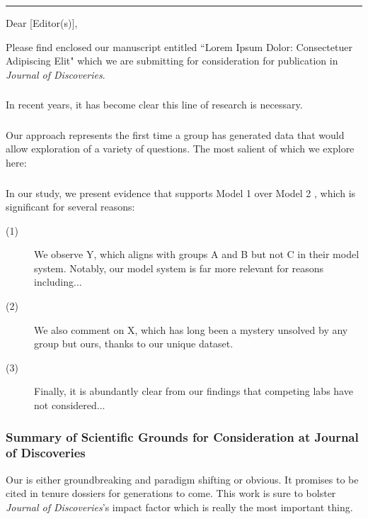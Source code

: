 \documentclass[11pt]{article}
\newcommand{\journalname}{Journal of Discoveries} %
\begin{document}
\noindent\rule{\linewidth}{1.2pt} %
\bigskip
\noindent Dear [Editor(s)],

\noindent Please find enclosed our manuscript entitled ``Lorem Ipsum Dolor: Consectetuer Adipiscing Elit" which we are submitting for consideration for publication in \textit{\journalname}.

\subsubsection{}
\noindent In recent years, it has become clear this line of research is necessary. \lipsum[1] 

\subsubsection{}
\noindent Our approach represents the first time a group has generated data that would allow exploration of a variety of questions. The most salient of which we explore here: 

\subsubsection{}
In our study, we present evidence that supports Model 1 \citep{zany2023quantum} over Model 2 \citep{wacky2023spaghetti}, which is significant for several reasons:

\begin{description}
  \item[(1)] We observe Y, which aligns with groups A and B but not C in their model system. Notably, our model system is far more relevant for reasons including...
  \item[(2)] We also comment on X, which has long been a mystery unsolved by any group but ours, thanks to our unique dataset.
  \item[(3)] Finally, it is abundantly clear from our findings that competing labs have not considered...
\end{description}

\subsubsection*{Summary of Scientific Grounds for Consideration at \journalname}
\noindent Our is either groundbreaking and paradigm shifting or obvious. It promises to be cited in tenure dossiers for generations to come. This work is sure to bolster \textit{\journalname}'s impact factor which is really the most important thing. 
\end{document}

